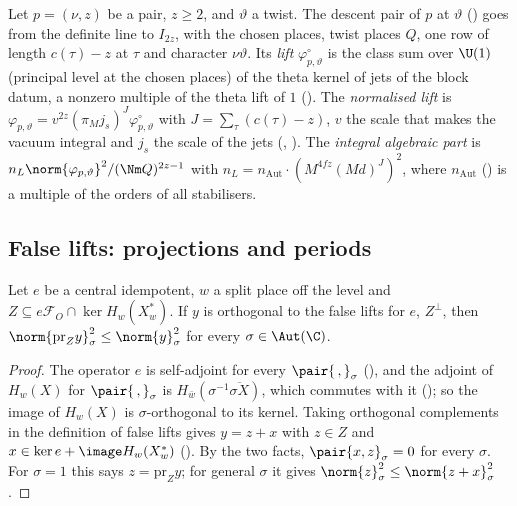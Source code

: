 \begin{definition}
\label{ol-values:def:rankone}
Let $p=(\nu,z)$ be a pair, $z\ge2$, and $\vartheta$ a twist. The descent pair of $p$ at $\vartheta$
() goes from the definite line to $I_{2z}$, with the chosen
places, twist places $Q$, one row of length $c(\tau)-z$ at $\tau$ and character $\nu\vartheta$. Its
\emph{lift} $\varphi^\circ_{p,\vartheta}$ is the class sum over $\U(1)$ (principal level at the
chosen places) of the theta kernel of jets of the block datum, a nonzero multiple of the theta lift
of $1$ (). The \emph{normalised lift} is
$\varphi_{p,\vartheta}=v^{2z}(\pi_M j_s)^{J}\varphi^\circ_{p,\vartheta}$ with
$J=\sum_\tau(c(\tau)-z)$, $v$ the scale that makes the vacuum integral and $j_s$ the scale of the
jets (, ). The \emph{integral
algebraic part} is $n_L\norm{\varphi_{p,\vartheta}}^2/(\Nm Q)^{2z-1}$ with
$n_L=n_{\mathrm{Aut}}\cdot(M^{4fz}(Md)^J)^2$, where $n_{\mathrm{Aut}}$
() is a multiple of the orders of all stabilisers.
\end{definition}

\subsection{False lifts: projections and periods}

\begin{lemma}\label{ol-values:lem:proj}
Let $e$ be a central idempotent, $w$ a split place off the level and
$Z\subseteq e\mathcal F_O\cap\ker H_w(X^*_w)$. If $y$ is orthogonal to the false lifts for $e$,
$Z^\perp$, then $\norm{\mathrm{pr}_Zy}^2_\sigma\le\norm{y}^2_\sigma$ for every $\sigma\in\Aut(\C)$.
\end{lemma}

\begin{proof}
The operator $e$ is self-adjoint for every $\pair{\,,}_\sigma$
(), and the adjoint of $H_w(X)$ for
$\pair{\,,}_\sigma$ is $H_{\bar w}(\sigma^{-1}\overline{\sigma X})$, which commutes with it
(); so the image of $H_w(X)$ is
$\sigma$-orthogonal to its kernel. Taking orthogonal complements in the definition of false lifts
gives $y=z+x$ with $z\in Z$ and $x\in\ker e+\image H_w(X^*_w)$
(). By the two facts,
$\pair{x,z}_\sigma=0$ for every $\sigma$. For $\sigma=1$ this says $z=\mathrm{pr}_Zy$; for general
$\sigma$ it gives $\norm{z}^2_\sigma\le\norm{z+x}^2_\sigma$.
\end{proof}

